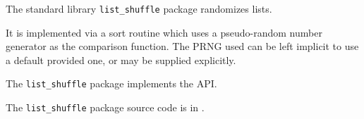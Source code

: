 
The standard library {\tt list\_shuffle} package randomizes lists.

It is implemented via a sort routine which uses a pseudo-random number 
generator as the comparison function.  The {\sc PRNG} used can be left 
implicit to use a default provided one, or may be supplied explicitly.

The {\tt list\_shuffle} package implements the  API.

The {\tt list\_shuffle} package source code is in .



